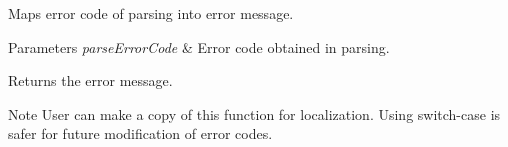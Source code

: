 Maps error code of parsing into error message. 


\begin{DoxyParams}{Parameters}
{\em parse\+Error\+Code} & Error code obtained in parsing. \\
\hline
\end{DoxyParams}
\begin{DoxyReturn}{Returns}
the error message. 
\end{DoxyReturn}
\begin{DoxyNote}{Note}
User can make a copy of this function for localization. Using switch-\/case is safer for future modification of error codes. 
\end{DoxyNote}
